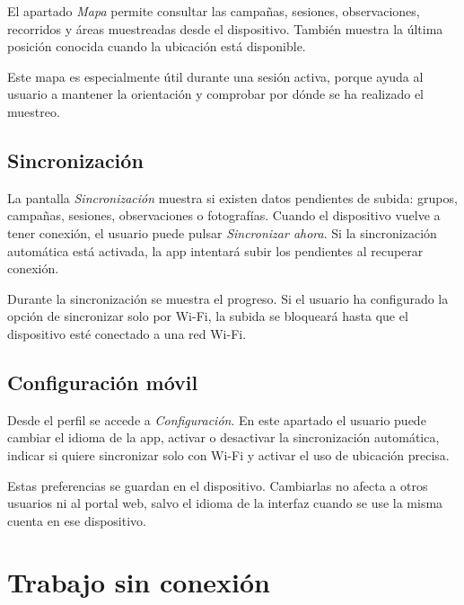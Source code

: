 El apartado \textit{Mapa} permite consultar las campañas, sesiones, observaciones,
recorridos y áreas muestreadas desde el dispositivo. También muestra la última
posición conocida cuando la ubicación está disponible.


Este mapa es especialmente útil durante una sesión activa, porque ayuda al usuario a
mantener la orientación y comprobar por dónde se ha realizado el muestreo.

\subsection{Sincronización}

La pantalla \textit{Sincronización} muestra si existen datos pendientes de subida:
grupos, campañas, sesiones, observaciones o fotografías. Cuando el dispositivo vuelve
a tener conexión, el usuario puede pulsar \textit{Sincronizar ahora}. Si la
sincronización automática está activada, la app intentará subir los pendientes al
recuperar conexión.


Durante la sincronización se muestra el progreso. Si el usuario ha configurado la
opción de sincronizar solo por Wi-Fi, la subida se bloqueará hasta que el dispositivo
esté conectado a una red Wi-Fi.

\subsection{Configuración móvil}

Desde el perfil se accede a \textit{Configuración}. En este apartado el usuario puede
cambiar el idioma de la app, activar o desactivar la sincronización automática,
indicar si quiere sincronizar solo con Wi-Fi y activar el uso de ubicación precisa.


Estas preferencias se guardan en el dispositivo. Cambiarlas no afecta a otros
usuarios ni al portal web, salvo el idioma de la interfaz cuando se use la misma
cuenta en ese dispositivo.

\section{Trabajo sin conexión}

